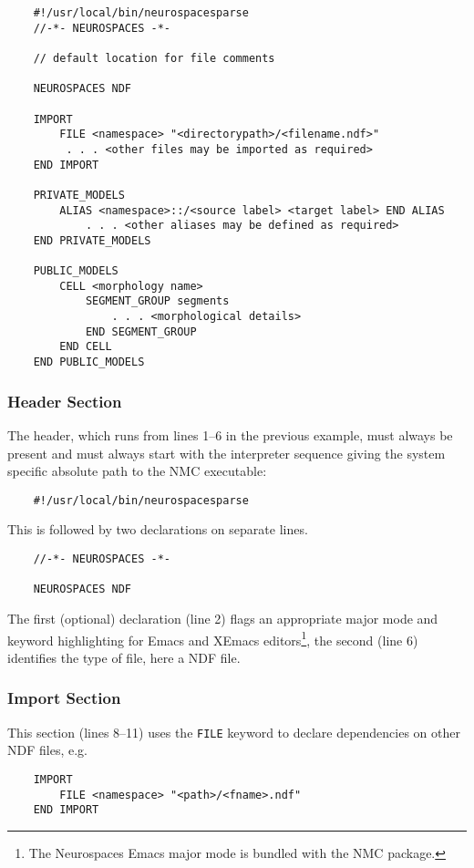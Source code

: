 \documentclass[12pt]{article}
\begin{document}
\begin{center}
 \begin{linenumbers}
\begin{verbatim}
    #!/usr/local/bin/neurospacesparse
    //-*- NEUROSPACES -*-

    // default location for file comments

    NEUROSPACES NDF

    IMPORT
        FILE <namespace> "<directorypath>/<filename.ndf>"
         . . . <other files may be imported as required>
    END IMPORT

    PRIVATE_MODELS
        ALIAS <namespace>::/<source label> <target label> END ALIAS
            . . . <other aliases may be defined as required>
    END PRIVATE_MODELS

    PUBLIC_MODELS
        CELL <morphology name>
            SEGMENT_GROUP segments
                . . . <morphological details>
            END SEGMENT_GROUP
        END CELL
    END PUBLIC_MODELS
\end{verbatim}
\end{linenumbers}
\end{center}

\subsubsection*{Header Section}
The header, which runs from lines 1--6 in the previous example, must always be present and must always start with the
interpreter sequence giving the system specific absolute path to the
NMC executable:
\begin{verbatim}
    #!/usr/local/bin/neurospacesparse
\end{verbatim}
This is followed by two declarations on separate lines. 
\begin{verbatim}
    //-*- NEUROSPACES -*-
    
    NEUROSPACES NDF
    \end{verbatim}
The first (optional) declaration (line 2) flags an appropriate major mode and keyword highlighting for Emacs and
XEmacs editors\footnote{The Neurospaces Emacs major mode is bundled
  with the NMC package.}, the second (line 6) identifies the type
of file, here a NDF file.

\subsubsection*{Import Section}
This section (lines 8--11) uses the {\tt  FILE} keyword to declare dependencies on other NDF files, e.g.
\begin{verbatim}
    IMPORT
        FILE <namespace> "<path>/<fname>.ndf"
    END IMPORT
\end{verbatim}
\end{document}
